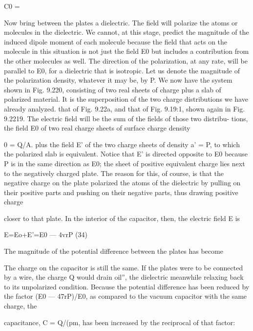 \begin{equation}
\end{equation}
C0 = %

Now bring between the plates a dielectric. The field will polarize
the atoms or molecules in the dielectric. We cannot, at this stage,
predict the magnitude of the induced dipole moment of each molecule
because the field that acts on the molecule in this situation is
not just the field E0 but includes a contribution from the other molecules
as well. The direction of the polarization, at any rate, will be
parallel to E0, for a dielectric that is isotropic. Let us denote the
magnitude of the polarization density, whatever it may be, by P.
We now have the system shown in Fig. 9.220, consisting of two real
sheets of charge plus a slab of polarized material. It is the superposition
of the two charge distributions we have already analyzed.
that of Fig. 9.22a, and that of Fig. 9.19:1, shown again in Fig. 9.2219.
The electric field will be the sum of the fields of those two distribu-
tions, the field E0 of two real charge sheets of surface charge density

0 = Q/A. plus the field E' of the two charge sheets of density a' = P,
to which the polarized slab is equivalent. Notice that E' is directed
opposite to E0 because P is in the same direction as E0; the sheet of
positive equivalent charge lies next to the negatively charged plate.
The reason for this, of course, is that the negative charge on the plate
polarized the atoms of the dielectric by pulling on their positive parts
and pushing on their negative parts, thus drawing positive charge

closer to that plate. In the interior of the capacitor, then, the electric
field E is

\begin{equation}
\end{equation}
E=Eo+E'=E0 --- 4vrP (34)

The magnitude of the potential difference between the plates has
become

The charge on the capacitor is still the same. If the plates were to
be connected by a wire, the charge Q would drain oil'', the dielectric
meanwhile relaxing back to its unpolarized condition. Because the
potential difference has been reduced by the factor (E0  ---  47rP)/E0,
as compared to the vacuum capacitor with the same charge, the

capacitance, C = Q/(pm, has been increased by the reciprocal of that
factor:

